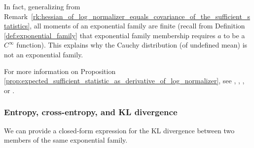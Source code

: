 \documentclass{article} %
\begin{document}
\begin{remark}
In fact, generalizing from Remark~\ref{rk:hessian_of_log_normalizer_equals_covariance_of_the_sufficient_statistics}, all moments of an exponential family are finite (recall from Definition \ref{def:exponential_family} that exponential family membership requires $a$ to be a $C^\infty$ function).  This explains why the Cauchy distribution (of undefined mean) is not an exponential family.
\label{rk:any_exponential_family_has_finite_moments}
\end{remark}



For more information on Proposition \ref{prop:expected_sufficient_statistic_as_derivative_of_log_normalizer}, see \citet{jordan2010exponential}, \citet{jordan2010conjugate}, \citet{nielsen2010entropies}, or \citet{nielsen2009statistical}.   

\subsubsection{Entropy, cross-entropy, and KL divergence}

We can provide a closed-form expression for the KL divergence between two members of the same exponential family. 
\end{document}
